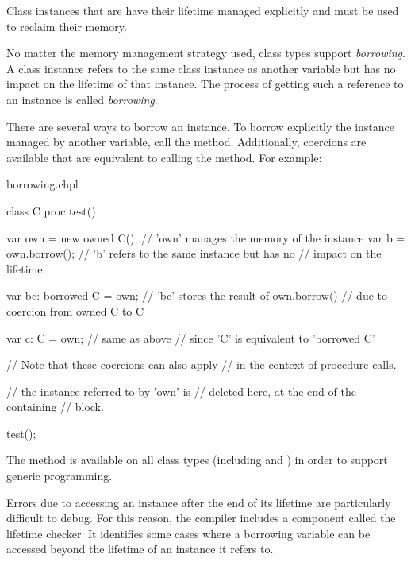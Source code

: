 Class instances that are  have their lifetime managed
explicitly and  must be used to reclaim their memory.

No matter the memory management strategy used, class types support
\emph{borrowing}.
A  class instance refers to the same class instance as
another variable but has no impact on the lifetime of that instance. The
process of getting such a reference to an instance is called
\emph{borrowing}.

There are several ways to borrow an instance. To borrow explicitly the
instance managed by another variable, call the  method.
Additionally, coercions are available that are equivalent to calling the
 method.  For example:

\begin{chapelexample}{borrowing.chpl}
\begin{chapel}
class C { }
proc test() {
  var own = new owned C();   // 'own' manages the memory of the instance
  var b = own.borrow();      // 'b' refers to the same instance but has no
                             // impact on the lifetime.

  var bc: borrowed C = own;  // 'bc' stores the result of own.borrow()
                             // due to coercion from owned C to C

  var c: C = own;            // same as above
                             // since 'C' is equivalent to 'borrowed C'

                             // Note that these coercions can also apply
                             // in the context of procedure calls.

                             // the instance referred to by 'own' is
                             // deleted here, at the end of the containing
                             // block.
}
\end{chapel}
\begin{chapelpost}
test();
\end{chapelpost}
\begin{chapeloutput}
\end{chapeloutput}
\end{chapelexample}

The  method is available on all class types (including
 and ) in order to support generic
programming.

Errors due to accessing an instance after the end of its lifetime are
particularly difficult to debug. For this reason, the compiler includes a
component called the lifetime checker. It identifies some cases where a
borrowing variable can be accessed beyond the lifetime of an instance it
refers to.

